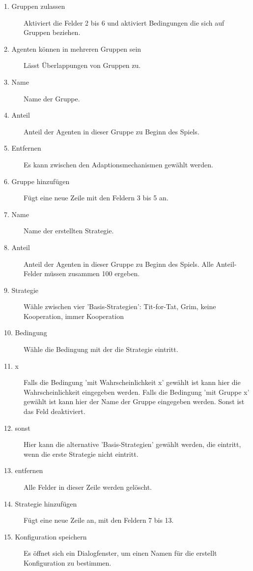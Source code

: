 \begin{description}

\item[1. Gruppen zulassen] Aktiviert die Felder 2 bis 6 und aktiviert Bedingungen die sich auf Gruppen beziehen.

\item[2. Agenten können in mehreren Gruppen sein] Lässt Überlappungen von Gruppen zu.

\item[3. Name] Name der Gruppe.

\item[4. Anteil] Anteil der Agenten in dieser Gruppe zu Beginn des Spiels.

\item[5. Entfernen] Es kann zwischen den Adaptionsmechanismen gewählt werden.

\item[6. Gruppe hinzufügen] Fügt eine neue Zeile mit den Feldern 3 bis 5 an.

\item[7. Name] Name der erstellten Strategie.

\item[8. Anteil] Anteil der Agenten in dieser Gruppe zu Beginn des Spiels. Alle Anteil-Felder müssen zusammen 100 ergeben.

\item[9. Strategie] Wähle zwischen vier 'Basis-Strategien': Tit-for-Tat, Grim, keine Kooperation, immer Kooperation

\item[10. Bedingung] Wähle die Bedingung mit der die Strategie eintritt. 

\item[11. x] Falls die Bedingung 'mit Wahrscheinlichkeit x' gewählt ist kann hier die Wahrscheinlichkeit eingegeben werden. Falls die Bedingung 'mit Gruppe x' gewählt ist kann hier der Name der Gruppe eingegeben werden. Sonst ist das Feld deaktiviert.

\item[12. sonst] Hier kann die alternative 'Basis-Strategien' gewählt werden, die eintritt, wenn die erste Strategie nicht eintritt.

\item[13. entfernen] Alle Felder in dieser Zeile werden gelöscht.

\item[14. Strategie hinzufügen] Fügt eine neue Zeile an, mit den Feldern 7 bis 13.

\item[15. Konfiguration speichern] Es öffnet sich ein Dialogfenster, um einen Namen für die erstellt Konfiguration zu bestimmen.


\end{description}
